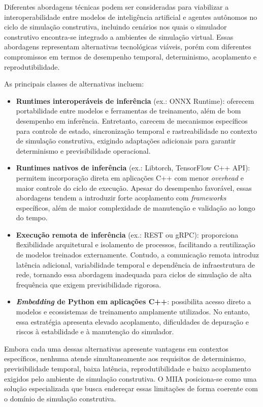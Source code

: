 Diferentes abordagens técnicas podem ser consideradas para viabilizar a interoperabilidade entre modelos de inteligência artificial e agentes autônomos no ciclo de simulação construtiva, incluindo cenários nos quais o simulador construtivo encontra-se integrado a ambientes de simulação virtual. Essas abordagens representam alternativas tecnológicas viáveis, porém com diferentes compromissos em termos de desempenho temporal, determinismo, acoplamento e reprodutibilidade.

As principais classes de alternativas incluem:

\begin{itemize}
    \item \textbf{Runtimes interoperáveis de inferência} (ex.: ONNX Runtime): oferecem portabilidade entre modelos e ferramentas de treinamento, além de bom desempenho em inferência. Entretanto, carecem de mecanismos específicos para controle de estado, sincronização temporal e rastreabilidade no contexto de simulação construtiva, exigindo adaptações adicionais para garantir determinismo e previsibilidade operacional.

    \item \textbf{Runtimes nativos de inferência} (ex.: Libtorch, TensorFlow C++ API): permitem incorporação direta em aplicações C++ com menor \emph{overhead} e maior controle do ciclo de execução. Apesar do desempenho favorável, essas abordagens tendem a introduzir forte acoplamento com \emph{frameworks} específicos, além de maior complexidade de manutenção e validação ao longo do tempo.

    \item \textbf{Execução remota de inferência} (ex.: REST ou gRPC): proporciona flexibilidade arquitetural e isolamento de processos, facilitando a reutilização de modelos treinados externamente. Contudo, a comunicação remota introduz latência adicional, variabilidade temporal e dependência de infraestrutura de rede, tornando essa abordagem inadequada para ciclos de simulação de alta frequência que exigem previsibilidade rigorosa.

    \item \textbf{\emph{Embedding} de Python em aplicações C++}: possibilita acesso direto a modelos e ecossistemas de treinamento amplamente utilizados. No entanto, essa estratégia apresenta elevado acoplamento, dificuldades de depuração e riscos à estabilidade e à manutenção do simulador.
\end{itemize}

Embora cada uma dessas alternativas apresente vantagens em contextos específicos, nenhuma atende simultaneamente aos requisitos de determinismo, previsibilidade temporal, baixa latência, reprodutibilidade e baixo acoplamento exigidos pelo ambiente de simulação construtiva. O MIIA posiciona-se como uma solução especializada que busca endereçar essas limitações de forma coerente com o domínio de simulação construtiva.

